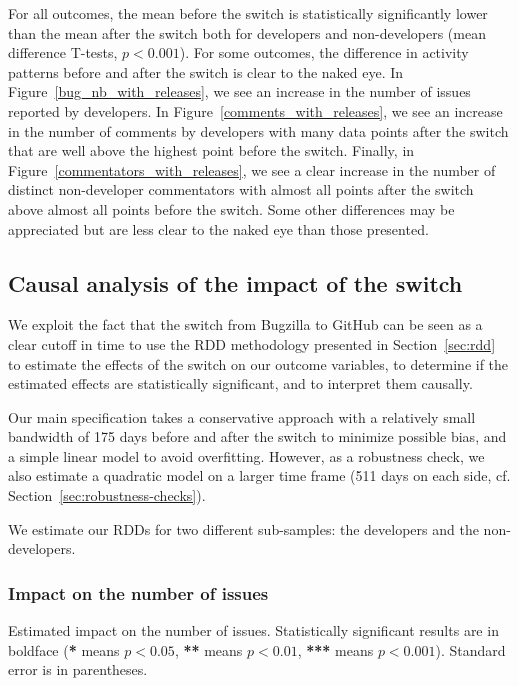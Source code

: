For all outcomes, the mean before the switch is statistically significantly lower than the mean after the switch both for developers and non-developers (mean difference T-tests, $p < 0.001$).
For some outcomes, the difference in activity patterns before and after the switch is clear to the naked eye.
In Figure~\ref{bug_nb_with_releases}, we see an increase in the number of issues reported by developers.
In Figure~\ref{comments_with_releases}, we see an increase in the number of comments by developers with many data points after the switch that are well above the highest point before the switch.
Finally, in Figure~\ref{commentators_with_releases}, we see a clear increase in the number of distinct non-developer commentators with almost all points after the switch above almost all points before the switch.
Some other differences may be appreciated but are less clear to the naked eye than those presented.

\subsection{Causal analysis of the impact of the switch}

\label{sec:causal-analysis}

We exploit the fact that the switch from Bugzilla to GitHub can be seen as a clear cutoff in time to use the RDD methodology presented in Section~\ref{sec:rdd} to estimate the effects of the switch on our outcome variables, to determine if the estimated effects are statistically significant, and to interpret them causally.

Our main specification takes a conservative approach with a relatively small bandwidth of 175 days before and after the switch to minimize possible bias, and a simple linear model to avoid overfitting. However, as a robustness check, we also estimate a quadratic model on a larger time frame (511 days on each side, cf. Section~\ref{sec:robustness-checks}).

We estimate our RDDs for two different sub-samples: the developers and the non-developers.

\subsubsection{Impact on the number of issues}

\begin{table}
	\begin{center}
		
		\caption{
			Estimated impact on the number of issues.
			Statistically significant results are in boldface (\textbf{*} means $p<0.05$, \textbf{**} means $p<0.01$, \textbf{***} means $p<0.001$).
			Standard error is in parentheses.
		}
		\label{tab:bug_nb}
	\end{center}
\end{table}

